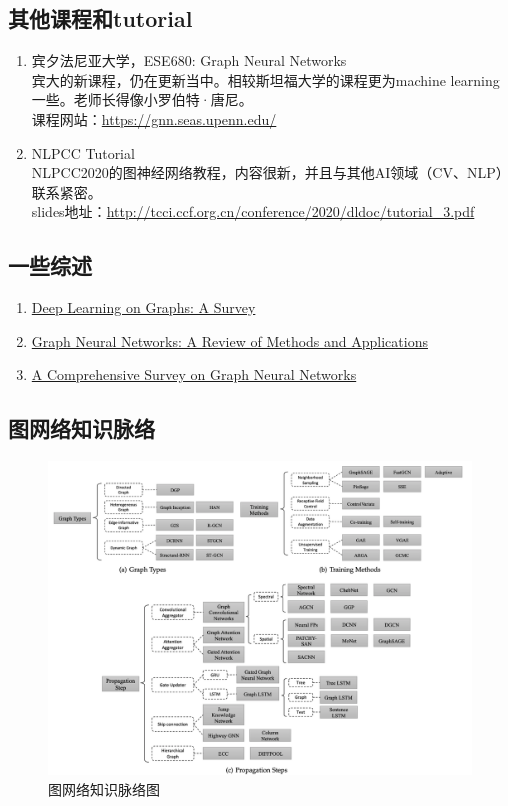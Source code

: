 \documentclass[lang=cn,11pt,a4paper]{eleganttemplate}
\begin{document}
\subsection{其他课程和tutorial}
\begin{enumerate}
    \item 宾夕法尼亚大学，ESE680: Graph Neural Networks \\
    宾大的新课程，仍在更新当中。相较斯坦福大学的课程更为machine learning一些。老师长得像小罗伯特·唐尼。 \\
    课程网站：\href{https://gnn.seas.upenn.edu/}{https://gnn.seas.upenn.edu/} 
    \item NLPCC Tutorial \\
    NLPCC2020的图神经网络教程，内容很新，并且与其他AI领域（CV、NLP）联系紧密。 \\
    slides地址：\href{http://tcci.ccf.org.cn/conference/2020/dldoc/tutorial_3.pdf}{http://tcci.ccf.org.cn/conference/2020/dldoc/tutorial\_3.pdf} 
\end{enumerate}

\subsection{一些综述}
\begin{enumerate}
    \item \href{https://arxiv.org/pdf/1812.04202.pdf}{Deep Learning on Graphs: A Survey}  
    \item \href{https://arxiv.org/pdf/1812.08434.pdf}{Graph Neural Networks: A Review of Methods and Applications} 
    \item \href{https://ieeexplore.ieee.org/abstract/document/9046288}{A Comprehensive Survey on Graph Neural Networks} 
\end{enumerate}

\subsection{图网络知识脉络}
\begin{figure}[htbp]
  \centering
  \includegraphics[width=1\textwidth]{image/gnn_1.png}
  \caption{图网络知识脉络图}
\end{figure}
\end{document}
